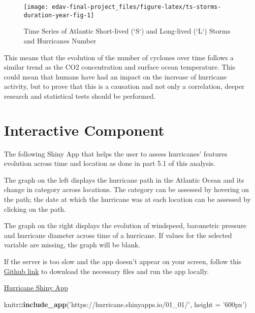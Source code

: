 \documentclass[]{book}
\newenvironment{Shaded}{\begin{snugshade}}{\end{snugshade}}
\newcommand{\DataTypeTok}[1]{\textcolor[rgb]{0.13,0.29,0.53}{#1}}
\newcommand{\KeywordTok}[1]{\textcolor[rgb]{0.13,0.29,0.53}{\textbf{#1}}}
\newcommand{\NormalTok}[1]{#1}
\newcommand{\OperatorTok}[1]{\textcolor[rgb]{0.81,0.36,0.00}{\textbf{#1}}}
\newcommand{\StringTok}[1]{\textcolor[rgb]{0.31,0.60,0.02}{#1}}
\begin{document}
\begin{figure}

{\centering \texttt{[image: edav-final-project\_files/figure-latex/ts-storms-duration-year-fig-1]} 

}

\caption{Time Series of Atlantic Short-lived (`S`) and Long-lived (`L`) Storms and Hurricanes Number}\label{fig:ts-storms-duration-year-fig}
\end{figure}

This means that the evolution of the number of cyclones over time follows a similar trend as the CO2 concentration and surface ocean temperature. This could mean that humans have had an impact on the increase of hurricane activity, but to prove that this is a causation and not only a correlation, deeper research and statistical tests should be performed.

\hypertarget{intercom}{%
\chapter{Interactive Component}\label{intercom}}

The following Shiny App that helps the user to assess hurricanes' features evolution across time and location as done in part 5.1 of this analysis.

The graph on the left displays the hurricane path in the Atlantic Ocean and its change in category across locations. The category can be assessed by hovering on the path; the date at which the hurricane was at each location can be assessed by clicking on the path.

The graph on the right displays the evolution of windspeed, barometric pressure and hurricane diameter across time of a hurricane. If values for the selected variable are missing, the graph will be blank.

If the server is too slow and the app doesn't appear on your screen, follow this \href{https://github.com/jqz300/edav_proj}{Github link} to download the necessary files and run the app locally.

\href{https://hurricane.shinyapps.io/01_01/}{Hurricane Shiny App}

\begin{Shaded}
\begin{Highlighting}[]
\NormalTok{knitr}\OperatorTok{::}\KeywordTok{include_app}\NormalTok{(}\StringTok{'https://hurricane.shinyapps.io/01_01/'}\NormalTok{, }\DataTypeTok{height =} \StringTok{'600px'}\NormalTok{)}
\end{Highlighting}
\end{Shaded}
\end{document}
